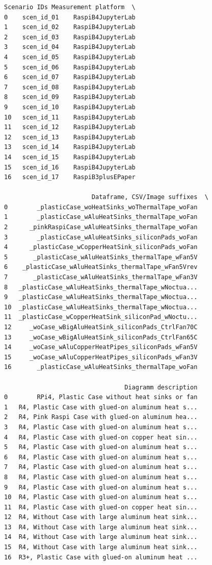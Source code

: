\documentclass[10pt,parskip=half,
toc=sectionentrywithdots,
bibliography=totocnumbered,
captions=tableheading,numbers=noendperiod]{scrartcl}
\begin{document}
\begin{lstlisting}[language={},postbreak={},numbers=none,xrightmargin=7pt,breakindent=0pt,aboveskip=5pt,belowskip=5pt]
   Scenario IDs Measurement platform  \
0    scen_id_01    RaspiB4JupyterLab
1    scen_id_02    RaspiB4JupyterLab
2    scen_id_03    RaspiB4JupyterLab
3    scen_id_04    RaspiB4JupyterLab
4    scen_id_05    RaspiB4JupyterLab
5    scen_id_06    RaspiB4JupyterLab
6    scen_id_07    RaspiB4JupyterLab
7    scen_id_08    RaspiB4JupyterLab
8    scen_id_09    RaspiB4JupyterLab
9    scen_id_10    RaspiB4JupyterLab
10   scen_id_11    RaspiB4JupyterLab
11   scen_id_12    RaspiB4JupyterLab
12   scen_id_13    RaspiB4JupyterLab
13   scen_id_14    RaspiB4JupyterLab
14   scen_id_15    RaspiB4JupyterLab
15   scen_id_16    RaspiB4JupyterLab
16   scen_id_17    RaspiB3plusEPaper

                        Dataframe, CSV/Image suffixes  \
0        _plasticCase_woHeatSinks_woThermalTape_woFan
1        _plasticCase_wAluHeatSinks_thermalTape_woFan
2      _pinkRaspiCase_wAluHeatSinks_thermalTape_woFan
3        _plasticCase_wAluHeatSinks_siliconPads_woFan
4      _plasticCase_wCopperHeatSink_siliconPads_woFan
5       _plasticCase_wAluHeatSinks_thermalTape_wFan5V
6    _plasticCase_wAluHeatSinks_thermalTape_wFan5Vrev
7       _plasticCase_wAluHeatSinks_thermalTape_wFan3V
8   _plasticCase_wAluHeatSinks_thermalTape_wNoctua...
9   _plasticCase_wAluHeatSinks_thermalTape_wNoctua...
10  _plasticCase_wAluHeatSinks_thermalTape_wNoctua...
11  _plasticCase_wCopperHeatSink_siliconPad_wNoctu...
12     _woCase_wBigAluHeatSink_siliconPads_CtrlFan70C
13     _woCase_wBigAluHeatSink_siliconPads_CtrlFan65C
14     _woCase_wAluCopperHeatPipes_siliconPads_wFan5V
15     _woCase_wAluCopperHeatPipes_siliconPads_wFan3V
16       _plasticCase_wAluHeatSinks_thermalTape_woFan

                                 Diagramm description
0        RPi4, Plastic Case without heat sinks or fan
1   R4, Plastic Case with glued-on aluminum heat s...
2   R4, Pink Raspi Case with glued-on aluminum hea...
3   R4, Plastic Case with glued-on aluminum heat s...
4   R4, Plastic Case with glued-on copper heat sin...
5   R4, Plastic Case with glued-on aluminum heat s...
6   R4, Plastic Case with glued-on aluminum heat s...
7   R4, Plastic Case with glued-on aluminum heat s...
8   R4, Plastic Case with glued-on aluminum heat s...
9   R4, Plastic Case with glued-on aluminum heat s...
10  R4, Plastic Case with glued-on aluminum heat s...
11  R4, Plastic Case with glued-on copper heat sin...
12  R4, Without Case with large aluminum heat sink...
13  R4, Without Case with large aluminum heat sink...
14  R4, Without Case with large aluminum heat sink...
15  R4, Without Case with large aluminum heat sink...
16  R3+, Plastic Case with glued-on aluminum heat ...
\end{lstlisting}
\end{document}
